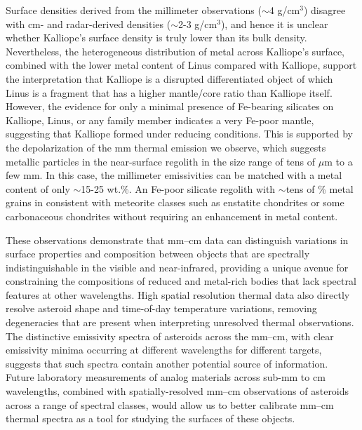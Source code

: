 \documentclass[]{aastex631}
\begin{document}
Surface densities derived from the millimeter observations ($\sim$4 g/cm$^3$) disagree with cm- and radar-derived densities ($\sim$2-3 g/cm$^3$), and hence it is unclear whether Kalliope's surface density is truly lower than its bulk density. Nevertheless, the heterogeneous distribution of metal across Kalliope's surface, combined with the lower metal content of Linus compared with Kalliope, support the interpretation that Kalliope is a disrupted differentiated object of which Linus is a fragment that has a higher mantle/core ratio than Kalliope itself. However, the evidence for only a minimal presence of Fe-bearing silicates on Kalliope, Linus, or any family member indicates a very Fe-poor mantle, suggesting that Kalliope formed under reducing conditions. This is supported by the depolarization of the mm thermal emission we observe, which suggests metallic particles in the near-surface regolith in the size range of tens of $\mu$m to a few mm. In this case, the millimeter emissivities can be matched with a metal content of only $\sim$15-25 wt.\%. An Fe-poor silicate regolith with $\sim$tens of \% metal grains in consistent with meteorite classes such as enstatite chondrites or some carbonaceous chondrites without requiring an enhancement in metal content.

These observations demonstrate that mm--cm data can distinguish variations in surface properties and composition between objects that are spectrally indistinguishable in the visible and near-infrared, providing a unique avenue for constraining the compositions of reduced and metal-rich bodies that lack spectral features at other wavelengths. High spatial resolution thermal data also directly resolve asteroid shape and time-of-day temperature variations, removing degeneracies that are present when interpreting unresolved thermal observations. The distinctive emissivity spectra of asteroids across the mm--cm, with clear emissivity minima occurring at different wavelengths for different targets, suggests that such spectra contain another potential source of information. Future laboratory measurements of analog materials across sub-mm to cm wavelengths, combined with spatially-resolved mm--cm observations of asteroids across a range of spectral classes, would allow us to better calibrate mm--cm thermal spectra as a tool for studying the surfaces of these objects.
\end{document}
